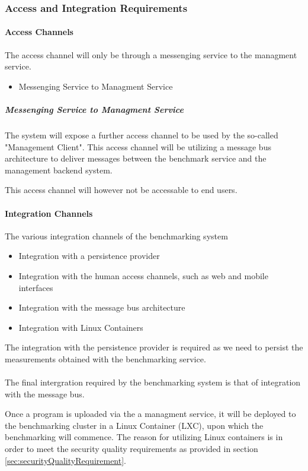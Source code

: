 \subsubsection{Access and Integration Requirements}
\label{sec:accessIntegrationRequirementsManagementSystem}
\paragraph{Access Channels}
The access channel will only be through a messenging service to the managment service.
\begin{itemize}
	\item Messenging Service to Managment Service
\end{itemize}

\subparagraph{Messenging Service to Managment Service}
The system will expose a further access channel to be used by the so-called
"Management Client". This access channel will be
utilizing a message bus architecture to deliver messages between the benchmark
service and the management backend system.

This access channel will however not be accessable to end users.

\paragraph{Integration Channels}
The various integration channels of the benchmarking system
\begin{itemize}
	\item Integration with a persistence provider
	\item Integration with the human access channels, such as web and
		mobile interfaces
	\item Integration with the message bus architecture
	\item Integration with Linux Containers
\end{itemize}

The integration with the persistence provider is required as we need to persist
the measurements obtained with the benchmarking service.\\\\

The final intergration required by the benchmarking system is that of integration
with the message bus.

Once a program is uploaded via the a managment service, it will be deployed
to the benchmarking cluster in a Linux Container (LXC), upon which the
benchmarking will commence.  The reason for utilizing Linux containers is in
order to meet the security quality requirements as provided in
section \ref{sec:securityQualityRequirement}.

